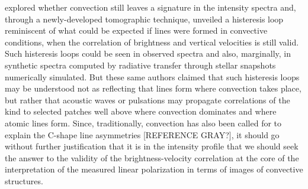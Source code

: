 \documentclass{/Users/art2/TeX/aanda/aa}
\begin{document}
\cite{kravchenko_tomography_2018} explored whether convection still leaves a signature in the intensity spectra and, through a newly-developed tomographic technique, unveiled 
a histeresis loop reminiscent of what could be expected if lines were formed in convective conditions, when the correlation of brightness and 
vertical velocities is still valid. Such histeresis loops could be seen in observed spectra and also, marginally, in synthetic spectra computed 
by radiative transfer through stellar snapshots  numerically simulated. But these same authors claimed that such histeresis loops may be understood 
not as reflecting that lines form where convection takes place, but rather that acoustic waves or pulsations may propagate correlations of the 
kind to selected patches well above where convection dominates and where atomic lines form. 
Since, traditionally, convection has also been called for to explain the C-shape line asymmetries [REFERENCE GRAY?], it should go without further justification that 
it is in the intensity profile that we should seek the answer to the validity of the brightness-velocity correlation at the core of the interpretation
of the measured linear polarization in terms of images of convective structures. 
\end{document}
